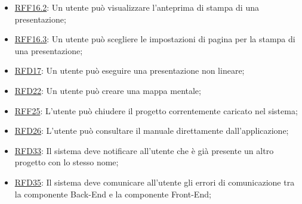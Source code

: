 \begin{itemize}
\item \hyperlink{RFF16.2}{RFF16.2}: Un utente può visualizzare l'anteprima di stampa di una presentazione;
\item \hyperlink{RFF16.3}{RFF16.3}: Un utente può scegliere le impostazioni di pagina per la stampa di una presentazione;
\item \hyperlink{RFD17}{RFD17}: Un utente può eseguire una presentazione non lineare;
\item \hyperlink{RFD22}{RFD22}: Un utente può creare una mappa mentale;
\item \hyperlink{RFF25}{RFF25}: L'utente può chiudere il progetto correntemente caricato nel sistema;
\item \hyperlink{RFD26}{RFD26}: L'utente può consultare il manuale direttamente dall'applicazione;
\item \hyperlink{RFD33}{RFD33}: Il sistema deve notificare all’utente che è già presente un altro progetto con lo stesso nome;
\item \hyperlink{RFD35}{RFD35}: Il sistema deve comunicare all'utente gli errori di comunicazione tra la componente Back-End e la componente Front-End;
\end{itemize}
